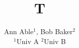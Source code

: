 \documentclass{article}
\begin{document}
\title{T}
\author{Ann Able$^{1}$, Bob Baker$^{2}$ \\ \kern2pt$^{1}$Univ A \quad $^{2}$Univ B}
\maketitle
\end{document}
